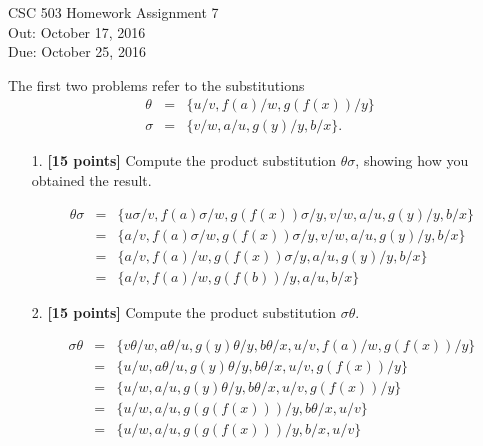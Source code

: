 \documentclass{article}
\begin{document}
\begin{center}
  {\LARGE CSC 503 Homework Assignment 7}\\
  Out: October 17, 2016 \\
  Due: October 25, 2016 \\
\end{center}


The first two problems refer to the substitutions
\begin{eqnarray*}
  \theta &=& \{ u/v, f(a)/w, g(f(x))/y \} \\
  \sigma &=& \{ v/w, a/u, g(y)/y, b/x \}.
\end{eqnarray*}

\begin{enumerate}

\item[1.] \textbf{[15 points]} Compute the product substitution
  $\theta\sigma$, showing how you obtained the result.
  \begin{answer}
  \begin{eqnarray*}
  \theta\sigma &=& \{ u\sigma/v, f(a)\sigma/w, g(f(x))\sigma/y, v/w, a/u, g(y)/y, b/x\} \\
  &=& \{ a/v, f(a)\sigma/w, g(f(x))\sigma/y, v/w, a/u, g(y)/y, b/x\}\\
  &=& \{ a/v, f(a)/w, g(f(x))\sigma/y, a/u, g(y)/y, b/x\}\\
  &=& \{ a/v, f(a)/w, g(f(b))/y, a/u, b/x\}
\end{eqnarray*}
  \end{answer}

\item[2.] \textbf{[15 points]} Compute the product substitution
  $\sigma\theta$.
  \begin{answer}
  \begin{eqnarray*}
  \sigma\theta &=& \{  v\theta/w, a\theta/u, g(y)\theta/y, b\theta/x, u/v, f(a)/w, g(f(x))/y\} \\
&=& \{  u/w, a\theta/u, g(y)\theta/y, b\theta/x, u/v, g(f(x))/y\}\\
&=& \{  u/w, a/u, g(y)\theta/y, b\theta/x, u/v, g(f(x))/y\}\\
&=& \{  u/w, a/u, g(g(f(x)))/y, b\theta/x, u/v\}\\
&=& \{  u/w, a/u, g(g(f(x)))/y, b/x, u/v\}
\end{eqnarray*}
  \end{answer}

\end{enumerate}
\end{document}
